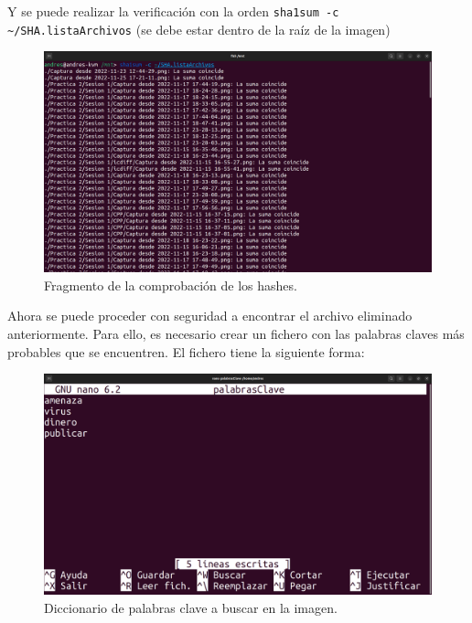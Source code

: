 \documentclass{article}
\begin{document}
Y se puede realizar la verificación con la orden \verb|sha1sum -c ~/SHA.listaArchivos| (se debe estar dentro de la raíz de la imagen)

\begin{figure}[H]
    \centering
    \includegraphics[width=\textwidth]{imagenes/Captura desde 2022-12-02 18-43-28.png}
    \caption{Fragmento de la comprobación de los hashes.}
\end{figure}

\newpage

Ahora se puede proceder con seguridad a encontrar el archivo eliminado anteriormente. Para ello, es necesario crear un fichero con las palabras claves más probables que se encuentren. El fichero tiene la siguiente forma:

\begin{figure}[H]
    \centering
    \includegraphics[width=\textwidth]{imagenes/Captura desde 2022-12-02 18-52-07.png}
    \caption{Diccionario de palabras clave a buscar en la imagen.}
\end{figure}
\end{document}
